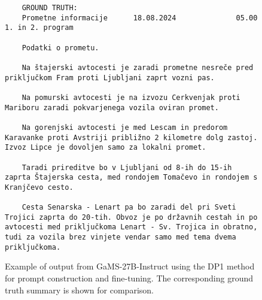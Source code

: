 \begin{figure*}[t]
\begin{verbatim}
    GROUND TRUTH:
    Prometne informacije      18.08.2024              05.00          1. in 2. program
    
    Podatki o prometu.
    
    Na štajerski avtocesti je zaradi prometne nesreče pred priključkom Fram proti Ljubljani zaprt vozni pas.
    
    Na pomurski avtocesti je na izvozu Cerkvenjak proti Mariboru zaradi pokvarjenega vozila oviran promet.
    
    Na gorenjski avtocesti je med Lescam in predorom Karavanke proti Avstriji približno 2 kilometre dolg zastoj. Izvoz Lipce je dovoljen samo za lokalni promet.
    
    Taradi prireditve bo v Ljubljani od 8-ih do 15-ih zaprta Štajerska cesta, med rondojem Tomačevo in rondojem s Kranjčevo cesto.
    
    Cesta Senarska - Lenart pa bo zaradi del pri Sveti Trojici zaprta do 20-tih. Obvoz je po državnih cestah in po avtocesti med priključkoma Lenart - Sv. Trojica in obratno, tudi za vozila brez vinjete vendar samo med tema dvema priključkoma.

    \end{verbatim}

    \caption{Example of output from GaMS-27B-Instruct using the DP1 method for prompt construction and fine-tuning. The corresponding ground truth summary is shown for comparison.}
    \label{fig:result_dp1}
\end{figure*}
